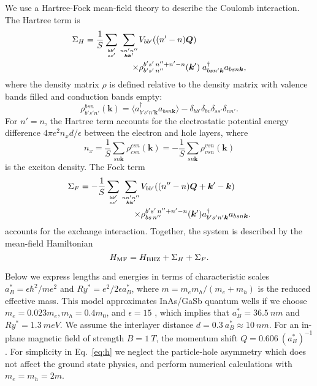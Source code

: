 \documentclass[reprint,aps,superscriptaddress]{revtex4-2}
\begin{document}
We use a Hartree-Fock mean-field theory to describe the Coulomb interaction. The Hartree term is
\begin{equation}
\begin{split}
\Sigma_H = \frac{1}{S}\sum_{bb'\atop ss'}\sum_{nn'n''\atop \bm k\bm k'} &V_{bb'}((n'-n)\bm Q) \\
\times&\rho_{b's'\,n''}^{b's'\,n''+n'-n}(\bm k') \; a_{bsn'\bm k}^{\dagger} a_{bsn\bm k},
\end{split}
\end{equation}
where the density matrix $\rho$ is defined relative to the density matrix with valence bands filled and conduction bands empty:
\begin{equation} \label{eq:rho}
\rho_{b's'n'}^{bsn}(\bm k) = \langle a_{b's'n'\bm k}^{\dagger} a_{bsn\bm k} \rangle - \delta_{bb'}\delta_{bv}\delta_{ss'}\delta_{nn'}.
\end{equation}
For $n'=n$, the Hartree term accounts for the electrostatic potential energy difference $4\pi e^2 n_x d/\epsilon$ between the electron and hole layers, where
\begin{equation}
n_x = \frac{1}{S} \sum_{sn\bm k} \rho_{csn}^{csn}(\bm k) = -\frac{1}{S} \sum_{sn\bm k} \rho_{vsn}^{vsn}(\bm k)
\end{equation}
is the exciton density. The Fock term
\begin{equation}
\begin{split}
\Sigma_F = -\frac{1}{S}\sum_{bb'\atop ss'}\sum_{nn'n''\atop \bm k\bm k'} &V_{bb'}((n''-n)\bm Q+\bm k'-\bm k) \\
\times&\rho_{bs\,n''}^{b's'\,n''+n'-n}(\bm k') a_{b's'n'\bm k}^{\dagger} a_{bsn\bm k}.
\end{split}
\end{equation}
accounts for the exchange interaction. Together, the system is described by the mean-field Hamiltonian
\begin{equation} \label{eq:H_MF}
H_{\rm{MF}} = H_{\rm{BHZ}} + \Sigma_H + \Sigma_F.
\end{equation}

Below we express lengths and energies in terms of characteristic scales $a_B^* = \epsilon\hbar^2/me^2$ and $Ry^* = e^2/2\epsilon a_B^*$, where $m=m_e m_h/(m_e+m_h)$ is the reduced effective mass. This model approximates InAs/GaSb quantum wells if we choose $m_e=0.023m_e,m_h=0.4m_0$, and $\epsilon=15$ \cite{levinshtein1996handbook}, which implies that $a_B^*=\SI{36.5}{nm}$ and $Ry^*=\SI{1.3}{meV}$. We assume the interlayer distance $d=0.3~a_B^*\approx\SI{10}{nm}$. For an in-plane magnetic field of strength $B=\SI{1}{T}$, the momentum shift $Q=0.606~(a_B^*)^{-1}$. For simplicity in Eq.~\eqref{eq:h} we neglect the particle-hole asymmetry which does not affect the ground state physics, and perform numerical calculations with $m_e=m_h=2m$.
\end{document}
